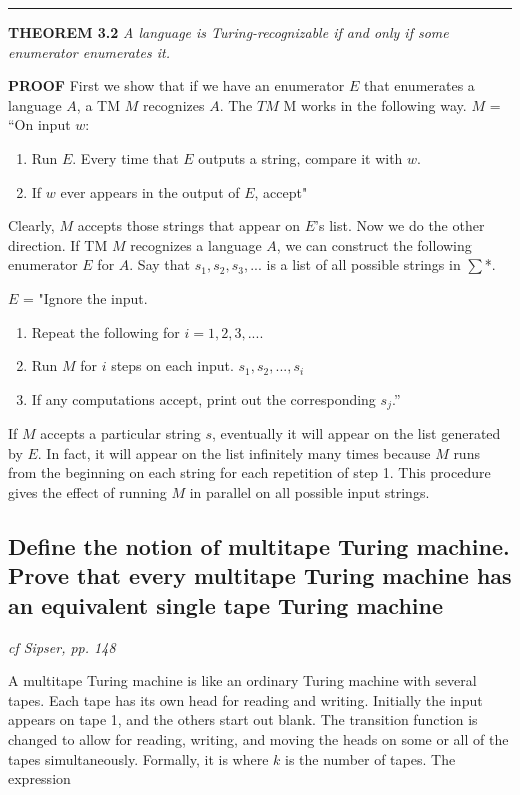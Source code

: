 \documentclass[main.tex]{subfiles}
\begin{document}
\par\rule{\textwidth}{0.4pt}
\textbf{THEOREM 3.2} \textit{A language is Turing-recognizable if and only if some enumerator enumerates it.}
\par\textbf{PROOF}
First we show that if we have an enumerator $E$ that enumerates a language $A$, a TM $M$ recognizes $A$. The $TM$ M works in the following way.
$M$ = “On input $w$:
\begin{enumerate}[label=\textbf{\arabic*}]
    \item Run $E$. Every time that $E$ outputs a string, compare it with $w$.
    \item If $w$ ever appears in the output of $E$, accept"
\end{enumerate}

Clearly, $M$ accepts those strings that appear on $E$’s list.
Now we do the other direction. If TM $M$ recognizes a language $A$, we can
construct the following enumerator $E$ for $A$. Say that $s_1, s_2, s_3, ...$ is
a list of all possible strings in $\sum$*.
\par$E$ = "Ignore the input.
\begin{enumerate}[label=\textbf{\arabic*}]
    \item Repeat the following for $i = 1, 2, 3, ...$.
    \item Run $M$ for $i$ steps on each input.  $s_1, s_2, ..., s_i$
    \item If any computations accept, print out the corresponding $s_j$.”
\end{enumerate}
If $M$ accepts a particular string $s$, eventually it will appear on the list generated
by $E$. In fact, it will appear on the list infinitely many times because $M$ runs
from the beginning on each string for each repetition of step 1. This procedure
gives the effect of running $M$ in parallel on all possible input strings. 
\subsection{Define the notion of multitape Turing machine. Prove that every multitape Turing machine has an equivalent single tape Turing machine}
\emph{cf Sipser, pp. 148}
\par A multitape Turing machine is like an ordinary Turing machine with several
tapes. Each tape has its own head for reading and writing. Initially the input
appears on tape 1, and the others start out blank. The transition function is
changed to allow for reading, writing, and moving the heads on some or all of
the tapes simultaneously. Formally, it is 
where $k$ is the number of tapes. The expression 
\end{document}
